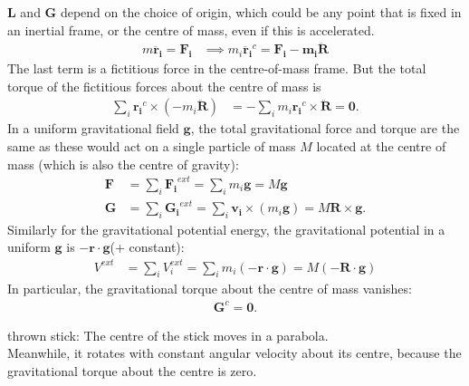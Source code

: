 \documentclass[a4paper]{article}
\begin{document}
$\mathbf{L}$ and $\mathbf{G}$ depend on the choice of origin, which could be any point that is fixed in an inertial frame, or the centre of mass, even if this is accelerated.
\begin{equation*}
\begin{aligned}
m\mathbf{\ddot{r_i}}=\mathbf{F_i} &\implies m_i \mathbf{\ddot{r_i}}^c = \mathbf{F_i}-\mathbf{m_i}\mathbf{\ddot{R}}
\end{aligned}
\end{equation*}
The last term is a fictitious force in the centre-of-mass frame. But the total torque of the fictitious forces about the centre of mass is
\begin{equation*}
\begin{aligned}
\sum_i \mathbf{r_i}^c \times \left(-m_i\mathbf{\ddot{R}}\right) &= -\sum_i m_i\mathbf{r_i}^c \times \mathbf{\ddot{R}} = \mathbf{0}.
\end{aligned}
\end{equation*}
In a uniform gravitational field $\mathbf{g}$, the total gravitational force and torque are the same as these would act on a single particle of mass $M$ located at the centre of mass (which is also the centre of gravity):
\begin{equation*}
\begin{aligned}
\mathbf{F}&= \sum_i \mathbf{F_i}^{ext} = \sum_i m_i \mathbf{g} = M\mathbf{g}\\
\mathbf{G}&= \sum_i \mathbf{G_i}^{ext} = \sum_i \mathbf{v_i}\times\left(m_i\mathbf{g}\right)=M\mathbf{R}\times\mathbf{g}.
\end{aligned}
\end{equation*}
Similarly for the gravitational potential energy, the gravitational potential in a uniform $\mathbf{g}$ is $-\mathbf{r}\cdot\mathbf{g}$(+ constant):
\begin{equation*}
\begin{aligned}
V^{ext} &= \sum_i V_i^{ext} = \sum_i m_i\left(-\mathbf{r}\cdot\mathbf{g}\right)=M\left(-\mathbf{R}\cdot\mathbf{g}\right)
\end{aligned}
\end{equation*}
In particular, the gravitational torque about the centre of mass vanishes:
\begin{equation*}
\begin{aligned}
\mathbf{G}^c = \mathbf{0}.
\end{aligned}
\end{equation*}

\begin{eg}
thrown stick:
The centre of the stick moves in a parabola.\\
Meanwhile, it rotates with constant angular velocity about its centre, because the gravitational torque about the centre is zero.
\end{eg}
\end{document}
